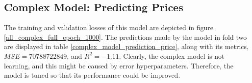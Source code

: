 \documentclass[12pt,twoside]{report}
\begin{document}
\subsection{Complex Model: Predicting Prices}
\label{complex_price}
The training and validation losses of this model are depicted in figure \ref{all_complex_full_epoch_1000}. The predictions made by the model in fold two are displayed in table \ref{complex_model_prediction_price}, along with its metrics, $MSE = 70788722849$, and $R^2 = -1.11$. Clearly, the complex model is not learning, and this might be caused by error hyperparameters. Therefore, the model is tuned so that its performance could be improved. 
\\
\begin{figure}[!htbp]
	\centering
	\hfill
	\hfill
	\hfil

\end{figure}
\end{document}
